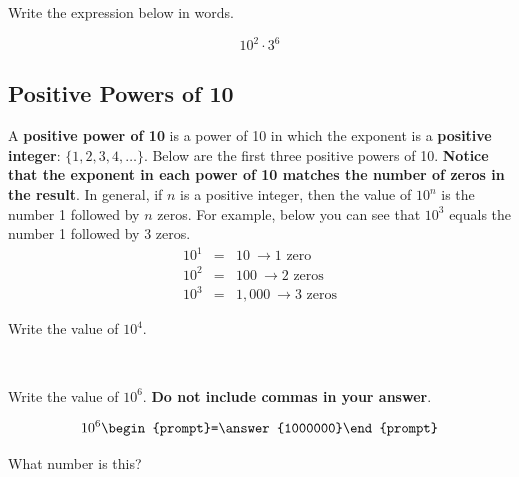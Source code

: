\documentclass{ximera}
\begin{document}
\begin{problem} Write the expression below in words.

\[  10^2 \cdot 3^6 \]

\begin{multipleChoice}
  \end{multipleChoice}

\end{problem}


\subsection*{Positive Powers of 10}

A \textbf{positive power of 10} is a power of 10 in which the exponent is a \textbf{positive integer}: $\{1, 2, 3, 4, \ldots\}.$
Below are the first three positive powers of 10.  \textbf{Notice that the exponent in each power of 10 matches the number of zeros in the result}.  In general, if $n$ is a positive integer, then the value of $10^n$ is the number 1 followed by $n$ zeros.  For example, below you can see that $10^3$ equals the number 1 followed by 3 zeros.
\begin{eqnarray*}
10^1 &=& 10 \ \rightarrow \textrm{1 zero}\\
10^2 &=& 100  \ \rightarrow \textrm{2 zeros} \\
10^3 &=& 1,000 \ \rightarrow \textrm{3 zeros}
\end{eqnarray*}


\begin{problem} Write the value of $10^4.$

~ \\[1em]  %

\begin{multipleChoice}
  \end{multipleChoice}

\end{problem}

\begin{problem} Write the value of $10^6.$  \textbf{Do not include commas in your answer}. 


\[ 10^6 \begin{prompt}=\answer{1000000}\end{prompt} \]

What number is this?

\begin{multipleChoice}
  \end{multipleChoice}


\end{problem}
\end{document}
